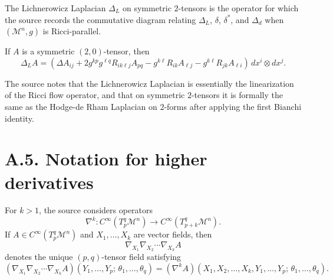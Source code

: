 \begin{definition}
\label{appa-def-lichnerowicz-laplacian}


The Lichnerowicz Laplacian \(\Delta_L\) on symmetric \(2\)-tensors is the operator for which the source records the commutative diagram relating \(\Delta_L\), \(\delta\), \(\delta^*\), and \(\Delta_d\) when \((\mathcal M^n,g)\) is Ricci-parallel.
\end{definition}

\begin{remark}
\label{appa-rem-lichnerowicz-laplacian-components}

If \(A\) is a symmetric \((2,0)\)-tensor, then
\[
\Delta_L A
= \left(\Delta A_{ij} + 2g^{kp}g^{\ell q}R_{ik\ell j}A_{pq} - g^{k\ell}R_{ik}A_{\ell j} - g^{k\ell}R_{jk}A_{\ell i}\right)\, dx^i \otimes dx^j .
\]
\end{remark}

\begin{remark}
\label{appa-rem-lichnerowicz-hodge-comparison}

The source notes that the Lichnerowicz Laplacian is essentially the linearization of the Ricci flow operator, and that on symmetric \(2\)-tensors it is formally the same as the Hodge-de Rham Laplacian on \(2\)-forms after applying the first Bianchi identity.
\end{remark}

\section*{A.5. Notation for higher derivatives}

\begin{definition}
\label{appa-def-higher-covariant-derivatives}


For \(k>1\), the source considers operators
\[
\nabla^k : C^\infty\!\left(T^q_p \mathcal M^n\right) \to C^\infty\!\left(T^q_{p+k} \mathcal M^n\right).
\]
If \(A\in C^\infty(T^q_p \mathcal M^n)\) and \(X_1,\ldots,X_k\) are vector fields, then
\[
\nabla_{X_1}\nabla_{X_2}\cdots\nabla_{X_k}A
\]
denotes the unique \((p,q)\)-tensor field satisfying
\[
(\nabla_{X_1}\nabla_{X_2}\cdots\nabla_{X_k}A)(Y_1,\ldots,Y_p;\,\theta_1,\ldots,\theta_q)
= (\nabla^k A)(X_1,X_2,\ldots,X_k,Y_1,\ldots,Y_p;\,\theta_1,\ldots,\theta_q).
\]
\end{definition}

